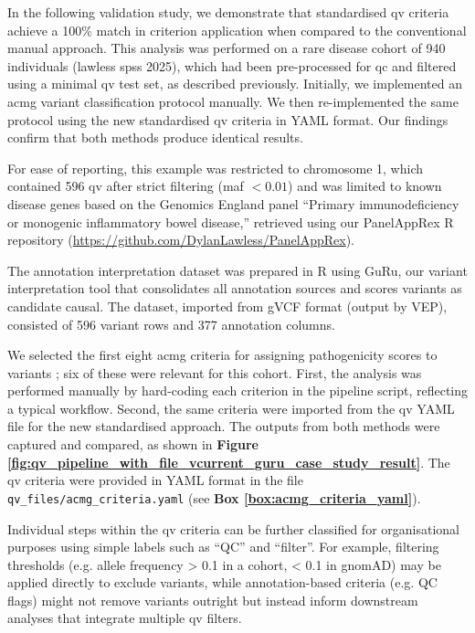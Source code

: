 In the following validation study, we demonstrate that standardised \ac{qv} criteria achieve a 100\% match in criterion application when compared to the conventional manual approach. This analysis was performed on a rare disease cohort of 940 individuals (lawless spss 2025), which had been pre-processed for \ac{qc} and filtered using a minimal \ac{qv} test set, as described previously. Initially, we implemented an \ac{acmg} variant classification protocol \cite{richards2015standards} manually. We then re-implemented the same protocol using the new standardised \ac{qv} criteria in YAML format. Our findings confirm that both methods produce identical results.

For ease of reporting, this example was restricted to chromosome 1, which contained 596 \ac{qv} after strict filtering (\ac{maf} $< 0.01$) and was limited to known disease genes based on the Genomics England panel ``Primary immunodeficiency or monogenic inflammatory bowel disease,'' retrieved using our PanelAppRex R repository (\url{https://github.com/DylanLawless/PanelAppRex}).

The annotation interpretation dataset was prepared in R using GuRu, our variant interpretation tool that consolidates all annotation sources and scores variants as candidate causal. The dataset, imported from gVCF format (output by VEP), consisted of 596 variant rows and 377 annotation columns. 

We selected the first eight \ac{acmg} criteria for assigning pathogenicity scores to variants \cite{richards2015standards}; six of these were relevant for this cohort. First, the analysis was performed manually by hard-coding each criterion in the pipeline script, reflecting a typical workflow. Second, the same criteria were imported from the \ac{qv} YAML file for the new standardised approach. The outputs from both methods were captured and compared, as shown in \textbf{Figure \ref{fig:qv_pipeline_with_file_vcurrent_guru_case_study_result}}. The \ac{qv} criteria were provided in YAML format in the file \texttt{qv\_files/acmg\_criteria.yaml} 
(see \textbf{Box \ref{box:acmg_criteria_yaml}}).

Individual steps within the \ac{qv} criteria can be further classified for organisational purposes using simple labels such as “QC” and “filter”. For example, filtering thresholds (e.g. allele frequency > 0.1 in a cohort, < 0.1 in gnomAD) may be applied directly to exclude variants, while annotation-based criteria (e.g. QC flags) might not remove variants outright but instead inform downstream analyses that integrate multiple \ac{qv} filters.


